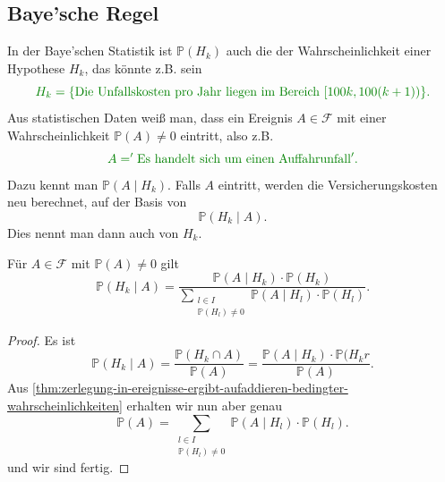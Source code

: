 \subsection{Baye'sche Regel}
In der Baye'schen Statistik ist $\mathbb{P}(H_k)$ auch die  der Wahrscheinlichkeit einer Hypothese $H_k$, das könnte z.B. sein
\[
    \color{green!50!black} H_k = \{\text{Die Unfallskosten pro Jahr liegen im Bereich } [100k,100(k+1))\}
.\] 
Aus statistischen Daten weiß man, dass ein Ereignis $A\in \mathcal{F}$ mit einer Wahrscheinlichkeit $\mathbb{P}(A) \neq 0$ eintritt, also z.B.
\[
    \color{green!50!black} A = '\text{Es handelt sich um  einen Auffahrunfall}'
.\] 
Dazu kennt man $\mathbb{P}(A\mid H_k)$. Falls $A$ eintritt, werden die Versicherungskosten neu berechnet, auf der Basis von
 \[
     \mathbb{P}(H_k \mid A)
.\] 
Dies nennt man dann auch  von $H_k$.
\begin{corollary}\label{cor:bayes}
    Für $A\in \mathcal{F}$ mit $\mathbb{P}(A)\neq 0$ gilt
    \[
        \mathbb{P}(H_k \mid A) = \frac{\mathbb{P}(A\mid H_k)\cdot \mathbb{P}(H_k)}{\sum\limits _{\substack{l\in I\\ \mathbb{P}(H_l)\neq 0}} \mathbb{P}(A\mid H_l)\cdot \mathbb{P}(H_l)}
    .\] 
\end{corollary}
\begin{proof}
    Es ist
    \[
        \mathbb{P}(H_k \mid A) = \frac{\mathbb{P}(H_k \cap A)}{\mathbb{P}(A)} =\frac{\mathbb{P}(A\mid H_k)\cdot \mathbb{P}(H_kr}{\mathbb{P}(A)}
    .\] 
    Aus \autoref{thm:zerlegung-in-ereignisse-ergibt-aufaddieren-bedingter-wahrscheinlichkeiten} erhalten wir nun aber genau
    \[
        \mathbb{P}(A) = \sum_{\substack{l\in I \\ \mathbb{P}(H_l)\neq 0} } \mathbb{P}(A\mid H_l)\cdot \mathbb{P}(H_l)
    .\] 
    und wir sind fertig.
\end{proof}
